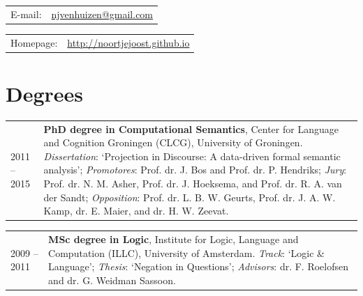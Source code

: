 \documentclass[a4paper,10pt]{article}
\def\leftcolwidth{.12\textwidth}
\def\tablevspace{10pt}
\begin{document}
\vspace{\tablevspace}

\noindent
\begin{tabularx}{\textwidth}{ p{\leftcolwidth} X }
  E-mail:         
  &         \href{mailto:njvenhuizen@gmail.com}{njvenhuizen@gmail.com}\\
\end{tabularx}

\vspace{\tablevspace}

\noindent
\begin{tabularx}{\textwidth}{ p{\leftcolwidth} X }
  Homepage:    &       \url{http://noortjejoost.github.io}
\end{tabularx}



\section*{Degrees}

\noindent
\begin{tabularx}{\textwidth}{ p{\leftcolwidth} X }
  2011 -- 2015
  & \textbf{PhD degree in Computational Semantics}, 
    Center for Language and Cognition Groningen (CLCG), University of
    Groningen. \textit{Dissertation}: `Projection in Discourse:
    A data-driven formal semantic analysis'; \textit{Promotores}: Prof. dr.
    J. Bos and Prof.  dr. P. Hendriks; \textit{Jury}: Prof. dr. N. M. Asher,
    Prof. dr. J. Hoeksema, and Prof. dr. R. A. van der Sandt;
    \textit{Opposition}: Prof. dr. L. B. W. Geurts, Prof. dr. J. A. W. Kamp,
    dr. E. Maier, and dr. H. W. Zeevat.  
\end{tabularx}

\vspace{\tablevspace}

\noindent
\begin{tabularx}{\textwidth}{ p{\leftcolwidth} X }
  2009 -- 2011
  & \textbf{MSc degree in Logic}, 
    Institute for Logic, Language and Computation (ILLC), University of
    Amsterdam. \textit{Track}: `Logic \& Language'; \textit{Thesis}: `Negation
    in Questions'; \textit{Advisors}: dr. F. Roelofsen and dr. G. Weidman
    Sassoon.
\end{tabularx}
\end{document}
